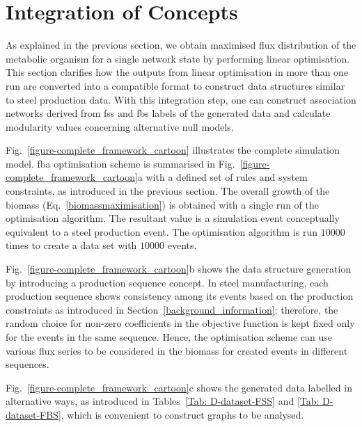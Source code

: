 \section{Integration of Concepts}
As explained in the previous section, we obtain maximised flux distribution of the metabolic organism for a single network state by performing linear optimisation. This section clarifies how the outputs from linear optimisation in more than one run are converted into a compatible format to construct data structures similar to steel production data. With this integration step, one can construct association networks derived from \acs{fss} and \acs{fbs} labels of the generated data and calculate modularity values concerning alternative null models.



Fig.~\ref{figure-complete_framework_cartoon} illustrates the complete simulation model. \acs{fba} optimisation scheme is summarised in Fig.~\ref{figure-complete_framework_cartoon}a with a defined set of rules and system constraints, as introduced in the previous section. The overall growth of the biomass (Eq.~\eqref{biomassmaximisation}) is obtained with a single run of the optimisation algorithm. The resultant value is a simulation event conceptually equivalent to a steel production event. The optimisation algorithm is run $10000$ times to create a data set with $10000$ events. 

Fig.~\ref{figure-complete_framework_cartoon}b shows the data structure generation by introducing a production sequence concept. In steel manufacturing, each production sequence shows consistency among its events based on the production constraints as introduced in Section~\ref{background_information}; therefore, the random choice for non-zero coefficients in the objective function is kept fixed only for the events in the same sequence. Hence, the optimisation scheme can use various flux series to be considered in the biomass for created events in different sequences. 

Fig.~\ref{figure-complete_framework_cartoon}c shows the generated data labelled in alternative ways, as introduced in Tables~\ref{Tab: D-dataset-FSS} and \ref{Tab: D-dataset-FBS}, which is convenient to construct graphs to be analysed.